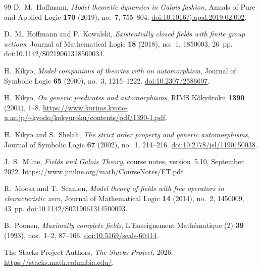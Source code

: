 \documentclass[10pt,a4paper]{amsart}
\theoremstyle{definition}
\begin{document}
\begin{thebibliography}{99}
D.~M.~Hoffmann,
\emph{Model theoretic dynamics in Galois fashion},
Annals of Pure and Applied Logic
\textbf{170} (2019), no.~7, 755--804.
\href{https://doi.org/10.1016/j.apal.2019.02.002}
{doi:10.1016/j.apal.2019.02.002}.

D.~M.~Hoffmann and P.~Kowalski,
\emph{Existentially closed fields with finite group actions},
Journal of Mathematical Logic
\textbf{18} (2018), no.~1, 1850003, 26~pp.
\href{https://doi.org/10.1142/S0219061318500034}
{doi:10.1142/S0219061318500034}.

H.~Kikyo,
\emph{Model companions of theories with an automorphism},
Journal of Symbolic Logic
\textbf{65} (2000), no.~3, 1215--1222.
\href{https://doi.org/10.2307/2586697}
{doi:10.2307/2586697}.

H.~Kikyo,
\emph{On generic predicates and automorphisms},
RIMS K\^oky\^uroku \textbf{1390} (2004), 1--8.
\url{https://www.kurims.kyoto-u.ac.jp/~kyodo/kokyuroku/contents/pdf/1390-1.pdf}.

H.~Kikyo and S.~Shelah,
\emph{The strict order property and generic automorphisms},
Journal of Symbolic Logic
\textbf{67} (2002), no.~1, 214--216.
\href{https://doi.org/10.2178/jsl/1190150038}
{doi:10.2178/jsl/1190150038}.

J.~S.~Milne,
\emph{Fields and Galois Theory},
course notes, version~5.10, September 2022.
\url{https://www.jmilne.org/math/CourseNotes/FT.pdf}.

R.~Moosa and T.~Scanlon,
\emph{Model theory of fields with free operators in characteristic zero},
Journal of Mathematical Logic
\textbf{14} (2014), no.~2, 1450009, 43~pp.
\href{https://doi.org/10.1142/S0219061314500093}
{doi:10.1142/S0219061314500093}.

B.~Poonen,
\emph{Maximally complete fields},
L'Enseignement Math\'ematique (2)
\textbf{39} (1993), nos.~1--2, 87--106.
\href{https://doi.org/10.5169/seals-60414}
{doi:10.5169/seals-60414}.

The Stacks Project Authors,
\emph{The Stacks Project}, 2026.
\url{https://stacks.math.columbia.edu/}.

\end{thebibliography}
\end{document}
